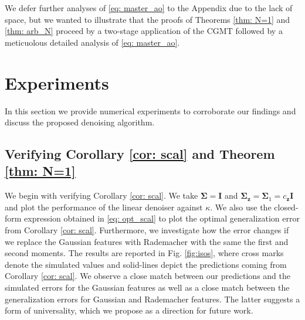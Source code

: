 \documentclass[final]{l4dc2026}
\newcommand{\bSigma}{\bm{\Sigma}}
\newcommand{\bI}{\mathbf{I}}
\newcommand{\bz}{\mathbf{z}}
\begin{document}
We defer further analyses of \eqref{eq: master_ao} to the Appendix due to the lack of space, but we wanted to illustrate that the proofs of Theorems \ref{thm: N=1} and \ref{thm: arb_N} proceed by a two-stage application of the CGMT followed by a meticuolous detailed analysis of \eqref{eq: master_ao}. 
\section{Experiments} \label{sec: experiments}
In this section we provide numerical experiments to corroborate our findings and discuss the proposed denoising algorithm.
\subsection{Verifying Corollary \ref{cor: scal} and Theorem \ref{thm: N=1}}
 We begin with verifying Corollary \ref{cor: scal}.  We take $\bSigma = \bI$ and $\bSigma_{\bz} = \bSigma_1 = c_{\bz} \bI$ and plot the performance of the linear denoiser against $\kappa$. We also use the closed-form expression obtained in \eqref{eq: opt_scal} to plot the optimal generalization error from Corollary \ref{cor: scal}.  Furthermore, we investigate how the error changes if we replace the Gaussian features with Rademacher with the same the first and second moments. The results are reported in Fig. \ref{fig:isos}, where cross marks denote the simulated values and solid-lines depict the  predictions coming from Corollary \ref{cor: scal}. We observe a close match between our predictions and the simulated errors for the Gaussian features as well as a close match between the generalization errors for Gaussian and Rademacher features. The latter suggests a form of universality, which we propose as a direction for future work. 
 
\end{document}
